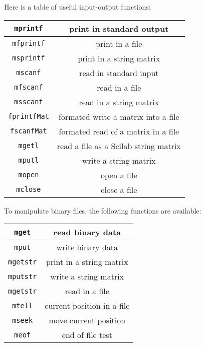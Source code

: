 Here is a table of useful input-output functions:

\begin{center}
\begin{tabular}{|c|c|}
\hline
\verb!mprintf! & print in standard output\\ \hline

\verb!mfprintf! & print in a file\\ \hline

\verb!msprintf! & print in a string matrix \\ \hline

\verb!mscanf! & read in standard input \\ \hline

\verb!mfscanf! & read in a file \\ \hline

\verb!msscanf! & read in a string matrix \\ \hline

\verb!fprintfMat! & formated write a matrix into a file  \\ \hline

\verb!fscanfMat! & formated read of a matrix in a file \\ \hline

\verb!mgetl! & read a file as a Scilab string matrix  \\ \hline

\verb!mputl! & write a string matrix \\ \hline

\verb!mopen! & open a file \\ \hline

\verb!mclose! & close a file\\ \hline
\end{tabular}
\end{center}

To manipulate binary files, the following functions are available:
\begin{center}
\begin{tabular}{|c|c|}
\hline
\verb!mget! & read binary data\\ \hline

\verb!mput! & write binary data\\ \hline

\verb!mgetstr! & print in a string matrix \\ \hline

\verb!mputstr! & write a string matrix \\ \hline

\verb!mgetstr! & read in a file \\ \hline

\verb!mtell! & current position in a file\\ \hline

\verb!mseek! & move current position  \\ \hline

\verb!meof! & end of file test \\ \hline
\end{tabular}
\end{center}

